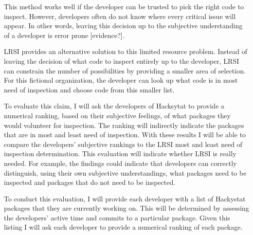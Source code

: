 This method works well if the developer can be trusted to pick the right
code to inspect. However, developers often do not know where every critical
issue will appear. In other words, leaving this decision up to the
subjective understanding of a developer is error prone [evidence?].

LRSI provides an alternative solution to this limited resource problem.
Instead of leaving the decision of what code to inspect entirely up to the
developer, LRSI can constrain the number of possibilities by providing a
smaller area of selection. For this fictional organization, the developer
can look up what code is in most need of inspection and choose code from
this smaller list. 

\hspace*{1pt}

To evaluate this claim, I will ask the developers of Hacksytat to provide a
numerical ranking, based on their subjective feelings, of what packages
they would volunteer for inspection. The ranking will indirectly indicate
the packages that are in most and least need of inspection. With these
results I will be able to compare the developers' subjective rankings to
the LRSI most and least need of inspection determination. This evaluation
will indicate whether LRSI is really needed. For example, the findings
could indicate that developers can correctly distinguish, using their own
subjective understandings, what packages need to be inspected and packages
that do not need to be inspected.

To conduct this evaluation, I will provide each developer with a list of
Hackystat packages that they are currently working on. This will be
determined by assessing the developers' active time and commits to a
particular package. Given this listing I will ask each developer to provide
a numerical ranking of each package.

